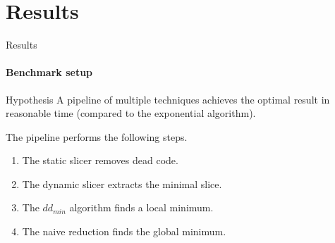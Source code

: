 \documentclass{beamer}
\begin{document}
\section{Results}

    \begin{frame}{Results}
      \framesubtitle{Benchmark setup}
      
      \begin{block}{Hypothesis}
        A pipeline of multiple techniques achieves the optimal result in reasonable time (compared to the exponential algorithm).
      \end{block}
      
      The pipeline performs the following steps.
      
      \begin{enumerate}
          \item The \alert{static slicer} removes dead code.\\
          \item The \alert{dynamic slicer} extracts the minimal slice.\\
          \item The \alert{$dd_{min}$ algorithm} finds a local minimum.\\
          \item The \alert{naive reduction} finds the global minimum.\\
      \end{enumerate}
      
    \end{frame}
\end{document}
